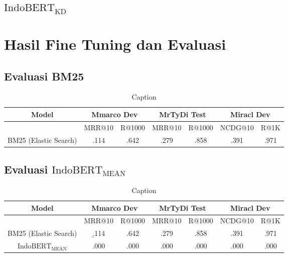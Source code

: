 \subsection{$\text{IndoBERT}_{\text{KD}}$}


\section{Hasil Fine Tuning dan Evaluasi}
\label{sec:hasil}

\subsection{Evaluasi BM25}
\label{sec:resultbm25}
    
\begin{table}[!ht]
    \centering
    \caption{Caption}
    \label{tab:bm25-result}
    \begin{tabular}{|c|cc|cc|cc|} \hline 
         Model&  \multicolumn{2}{|c|}{Mmarco Dev}& 
         \multicolumn{2}{|c|}{MrTyDi Test}&  \multicolumn{2}{|c|}{Miracl Dev}\\ \hline 
            & MRR@10 & R@1000 & MRR@10 & R@1000 & NCDG@10 & R@1K\\ \hline 
            BM25 (Elastic Search) & .114 & .642 & .279 & .858 & .391 & .971\\ \hline
            
    \end{tabular}
\end{table}

\subsection{Evaluasi $\text{IndoBERT}_{\text{MEAN}}$}
\label{sec:resultindobertmean}

\begin{table}[!ht]
    \centering
    \caption{Caption}
    \label{tab:indobertmean}
    \begin{tabular}{|c|cc|cc|cc|} \hline 
         Model&  \multicolumn{2}{|c|}{Mmarco Dev}& 
         \multicolumn{2}{|c|}{MrTyDi Test}&  \multicolumn{2}{|c|}{Miracl Dev}\\ \hline 
            & MRR@10 & R@1000 & MRR@10 & R@1000 & NCDG@10 & R@1K\\ \hline 
            BM25 (Elastic Search) & \b{.114} & .642 & .279 & .858 & .391 & .971\\ \hline
            $\text{IndoBERT}_{\text{MEAN}}$ & .000 & .000 & .000 & .000 & .000 & .000\\ \hline
    \end{tabular}
\end{table}


